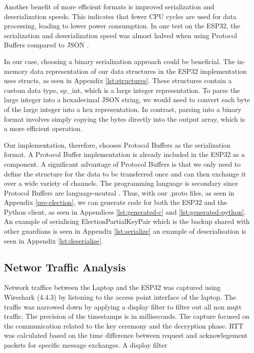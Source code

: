 Another benefit of more efficient formats is improved serialization and deserialization speeds. This indicates that fewer CPU cycles are used for data processing, leading to lower power consumption. In one test on the ESP32, the serialization and deserialization speed was almost halved when using Protocol Buffers compared to JSON \cite[11-12]{serialisation-comparison}. 

In our case, choosing a binary serialization approach could be beneficial. The in-memory data representation of our data structures in the ESP32 implementation uses structs, as seen in Appendix \ref{lst:structures}. These structures contain a custom data type, sp\_int, which is a large integer representation. To parse the large integer into a hexadecimal JSON string, we would need to convert each byte of the large integer into a hex representation. In contrast, parsing into a binary format involves simply copying the bytes directly into the output array, which is a more efficient operation.

Our implementation, therefore, chooses Protocol Buffers as the serialization format. A Protocol Buffer implementation is already included in the ESP32 as a component. A significant advantage of Protocol Buffers is that we only need to define the structure for the data to be transferred once and can then exchange it over a wide variety of channels. The programming language is secondary since Protocol Buffers are language-neutral \cite[224]{protobuffer}. Thus, with our .proto files, as seen in Appendix \ref{pre-election}, we can generate code for both the ESP32 and the Python client, as seen in Appendices \ref{lst:generated-c} and \ref{lst:generated-python}. An example of serialising ElectionPartialKeyPair which is the backup shared with other guardians is seen in Appendix \ref{lst:serialize} an example of deserialisation is seen in Appendix \ref{lst:deserialise}. 

\subsection{Networ Traffic Analysis}
Network traffice between the Laptop and the ESP32 was captured using Wireshark (4.4.3) by listening to the access point interface of the laptop. The traffic was narrowed down by applying a display filter to filter out all non mqtt traffic. The precision of the timestamps is in milliseconds. The capture focused on the communication related to the key ceremony and the decryption phase. \ac{RTT} was calculated based on the time difference between request and acknowlegement packets for specific message exchanges. A display filter 

